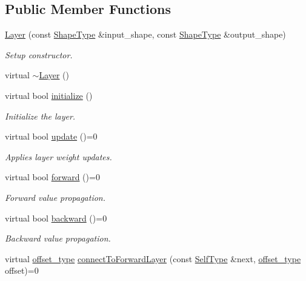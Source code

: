 \subsection*{Public Member Functions}
\begin{DoxyCompactItemize}
\item 
\hyperlink{classffnn_1_1layer_1_1_layer_a0c766a6f5770ea0ae8a7e660523eb413}{Layer} (const \hyperlink{classffnn_1_1layer_1_1_layer_ae2f2d0063ab4b2c2a3a6ebf81f4ec32f}{Shape\-Type} \&input\-\_\-shape, const \hyperlink{classffnn_1_1layer_1_1_layer_ae2f2d0063ab4b2c2a3a6ebf81f4ec32f}{Shape\-Type} \&output\-\_\-shape)
\begin{DoxyCompactList}\small\item\em Setup constructor. \end{DoxyCompactList}\item 
virtual \hyperlink{classffnn_1_1layer_1_1_layer_aa466bcb2ac40d059e9b6e40be157d1b4}{$\sim$\-Layer} ()
\item 
virtual bool \hyperlink{classffnn_1_1layer_1_1_layer_ae8a7daa81382a7965b8ab8861da7e522}{initialize} ()
\begin{DoxyCompactList}\small\item\em Initialize the layer. \end{DoxyCompactList}\item 
virtual bool \hyperlink{classffnn_1_1layer_1_1_layer_af1bce67477e4890a86aeb96ed1c781d6}{update} ()=0
\begin{DoxyCompactList}\small\item\em Applies layer weight updates. \end{DoxyCompactList}\item 
virtual bool \hyperlink{classffnn_1_1layer_1_1_layer_aa47aae451c4a9ee4daef90b60ac291a1}{forward} ()=0
\begin{DoxyCompactList}\small\item\em Forward value propagation. \end{DoxyCompactList}\item 
virtual bool \hyperlink{classffnn_1_1layer_1_1_layer_ac0762afdbcb7e41fb3197dec5ae67858}{backward} ()=0
\begin{DoxyCompactList}\small\item\em Backward value propagation. \end{DoxyCompactList}\item 
virtual \hyperlink{namespaceffnn_add5752d74b38c6e9b200f3d696fc3ec8}{offset\-\_\-type} \hyperlink{classffnn_1_1layer_1_1_layer_a0ef064e9b6c5c48e7326b0dc873ee2eb}{connect\-To\-Forward\-Layer} (const \hyperlink{classffnn_1_1layer_1_1_layer_a01db5ce644b97af72dca31a759aa33c5}{Self\-Type} \&next, \hyperlink{namespaceffnn_add5752d74b38c6e9b200f3d696fc3ec8}{offset\-\_\-type} offset)=0

\end{DoxyCompactItemize}
